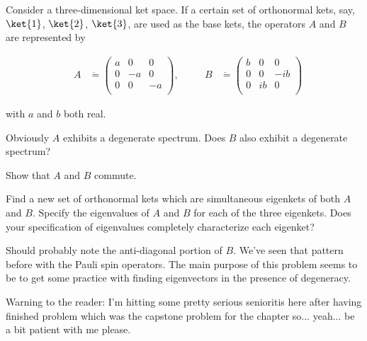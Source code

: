 \begin{question}
  Consider a three-dimensional ket space.  If a certain set of
  orthonormal kets, say, $\ket{1}$, $\ket{2}$, $\ket{3}$, are used as
  the base kets, the operators $A$ and $B$ are represented by

  \begin{equation*}
    \begin{alignedat}{2}
      &A &\dot{=}
      \begin{pmatrix}
        a & 0 & 0\\
        0 & -a & 0\\
        0 & 0 & -a\\
      \end{pmatrix}
      , &
      \quad
      & B& \dot{=}
      \begin{pmatrix}
        b & 0 & 0\\
        0 & 0 & -ib\\
        0 & ib & 0\\
      \end{pmatrix}
    \end{alignedat}
  \end{equation*}

  with $a$ and $b$ both real.

  \begin{questionpart}
    Obviously $A$ exhibits a degenerate spectrum.  Does $B$ also
    exhibit a degenerate spectrum?
  \end{questionpart}

  \begin{questionpart}
    Show that $A$ and $B$ commute.
  \end{questionpart}

  \begin{questionpart}
    Find a new set of orthonormal kets which are simultaneous
    eigenkets of both $A$ and $B$.  Specify the eigenvalues of $A$ and
    $B$ for each of the three eigenkets.  Does your specification of
    eigenvalues completely characterize each eigenket?
  \end{questionpart}
\end{question}

\begin{purpose}
  Should probably note the anti-diagonal portion of $B$.  We've seen
  that pattern before with the Pauli spin operators.  The main purpose
  of this problem seems to be to get some practice with finding
  eigenvectors in the presence of degeneracy.

  Warning to the reader: I'm hitting some pretty serious senioritis
  here after having finished problem  which
  was the capstone problem for the chapter so... yeah... be a bit
  patient with me please.
\end{purpose}

